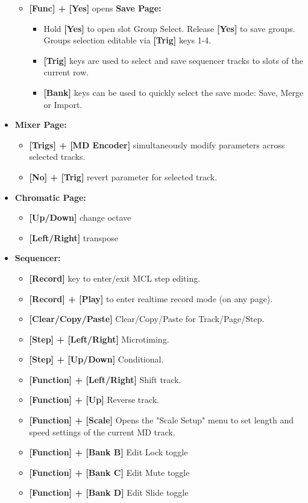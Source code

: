 \begin{itemize}
\begin{itemize}
\item \textbf{[Func] + [Yes]} opens \textbf{Save Page:}
    \begin{itemize}
    \item Hold \textbf{[Yes]} to open slot Group Select. Release \textbf{[Yes]} to save groups.  Groups selection editable via \textbf{[Trig]} keys 1-4.
    \item \textbf{[Trig]} keys are used to select and save sequencer tracks to slots of the current row.
    \item \textbf{[Bank]} keys can be used to quickly select the save mode: Save, Merge or Import.
    \end{itemize}
\end{itemize}

\item \textbf{Mixer Page:}
      \begin{itemize}
       \item \textbf{[Trigs] + [MD Encoder]} simultaneously modify parameters across selected tracks. 
      \item \textbf{[No] + [Trig]} revert parameter for selected track.
       \end{itemize}
\newpage
\item \textbf{Chromatic Page:}
      \begin{itemize}
      \item \textbf{[Up/Down]} change octave
      \item \textbf{[Left/Right]} transpose
      \end{itemize}

\item \textbf{Sequencer:}
\begin{itemize}
      \item \textbf{[Record]} key to enter/exit MCL step editing.
      \item \textbf{[Record] + [Play]} to enter realtime record mode (on any page).
      \item \textbf{[Clear/Copy/Paste]} Clear/Copy/Paste for Track/Page/Step.
      \item \textbf{[Step] + [Left/Right]} Microtiming.
      \item \textbf{[Step] + [Up/Down]} Conditional.
      \item \textbf{[Function] + [Left/Right]} Shift track.
      \item \textbf{[Function] + [Up]} Reverse track.
      \item \textbf{[Function] + [Scale]} Opens the "Scale Setup" menu to set length and speed settings of the current MD track.
      \item \textbf{[Function] + [Bank B]} Edit Lock toggle
      \item \textbf{[Function] + [Bank C]} Edit Mute toggle
      \item \textbf{[Function] + [Bank D]} Edit Slide toggle
\end{itemize}
\end{itemize}



